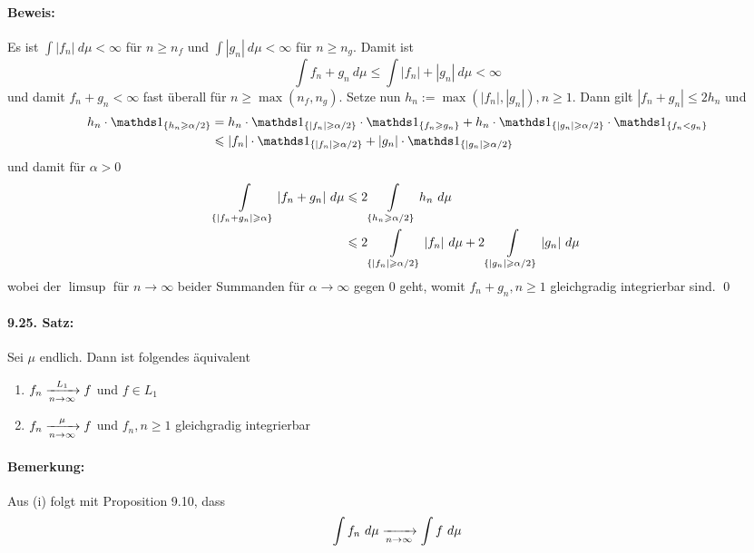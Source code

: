 \documentclass[11pt]{report}
\begin{document}
\paragraph{Beweis:}Es ist $\int|f_n|\ d\mu<\infty$ für $n\geq n_f$ und $\int|g_n|\ d\mu<\infty$ für $n\geq n_g$. Damit ist 
$$\int f_n+g_n\ d\mu\leq\int|f_n|+|g_n|\ d\mu<\infty$$
und damit $f_n+g_n<\infty$ fast überall für $n\geq\max(n_f,n_g)$. \newline\newline
Setze nun $h_n:=\max(|f_n|,|g_n|),n\geq1$. Dann gilt $|f_n+g_n|\leq 2h_n$ und 
\begin{align*}
    h_n\cdot\ind{\{h_n\geq\alpha/2\}}&=h_n\cdot\ind{\{|f_n|\geq\alpha/2\}}\cdot\ind{\{f_n\geq g_n\}}+h_n\cdot\ind{\{|g_n|\geq\alpha/2\}}\cdot\ind{\{f_n< g_n\}}\\
    &\leq|f_n|\cdot\ind{\{|f_n|\geq\alpha/2\}}+|g_n|\cdot\ind{\{|g_n|\geq\alpha/2\}}
\end{align*}
und damit für $\alpha>0$
\begin{align*}
    \int\displaylimits_{\{|f_n+g_n|\geq\alpha\}}|f_n+g_n|\ d\mu&\leq2\int\displaylimits_{\{h_n\geq\alpha/2\}}h_n\ d\mu\\
    &\leq2\int\displaylimits_{\{|f_n|\geq\alpha/2\}}|f_n|\ d\mu+2\int\displaylimits_{\{|g_n|\geq\alpha/2\}}|g_n|\ d\mu
\end{align*} 
wobei der $\limsup$ für $n\to\infty$ beider Summanden für $\alpha\to\infty$ gegen $0$ geht, womit $f_n+g_n,n\geq1$ gleichgradig integrierbar sind. \qed

\paragraph{9.25. Satz:}Sei $\mu$ endlich. Dann ist folgendes \"aquivalent
\begin{enumerate}[label=(\roman*)]
    \item $f_n\nto{L_1}{n\to\infty}f$ und $f\in L_1 $
    \item $f_n\nto{\mu}{n\to\infty}f$ und $f_n,n\geq1$ gleichgradig integrierbar
\end{enumerate}

\paragraph{Bemerkung:}Aus (i) folgt mit Proposition 9.10, dass 
$$\int f_n\ d\mu\nto{}{n\to\infty}\int f\ d\mu$$
\end{document}
